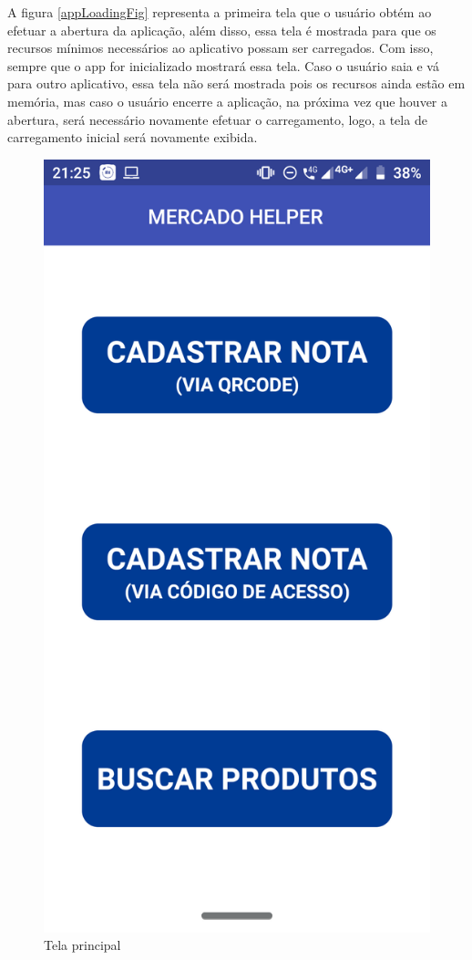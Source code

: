 A figura \ref{appLoadingFig} representa a primeira tela que o usuário obtém ao efetuar a abertura da aplicação, além disso, essa tela é mostrada para que os recursos mínimos necessários ao aplicativo possam ser carregados. Com isso, sempre que o app for inicializado mostrará essa tela. Caso o usuário saia e vá para outro aplicativo, essa tela não será mostrada pois os recursos ainda estão em memória, mas caso o usuário encerre a aplicação, na próxima vez que houver a abertura, será necessário novamente efetuar o carregamento, logo, a tela de carregamento inicial será novamente exibida.

\begin{figure}[h]
    \centering
    \includegraphics[scale=0.15]{tcc/figures/app/app_home.png}
    \caption{Tela principal}
    \label{appHomeFig}
\end{figure}

